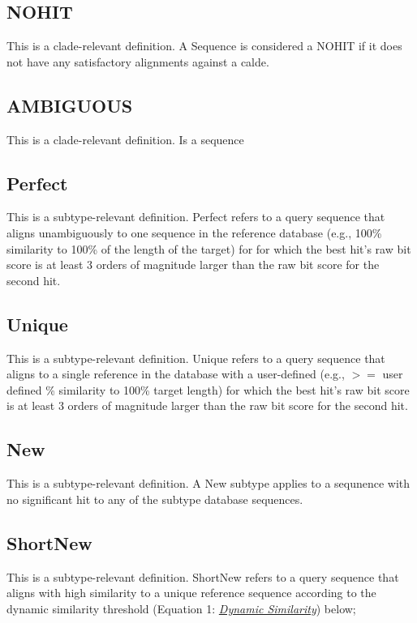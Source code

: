 \documentclass[letterpaper,10pt,english]{sphinxmanual}
\begin{document}
\subsection{NOHIT}
\label{defs:nohits}\label{defs:nohit}
This is a clade-relevant definition. A Sequence is considered a NOHIT if it does not have any satisfactory alignments against a calde.


\subsection{AMBIGUOUS}
\label{defs:ambiguous}\label{defs:id1}
This is a clade-relevant definition. Is a sequence


\subsection{Perfect}
\label{defs:perfect}\label{defs:id2}
This is a subtype-relevant definition. Perfect refers to a query
sequence that aligns unambiguously to one sequence in the reference
database (e.g., 100\% similarity to 100\% of the length of the target)
for for which the best hit's raw bit score is at least 3 orders of
magnitude larger than the raw bit score for the second hit.


\subsection{Unique}
\label{defs:unique}\label{defs:id3}
This is a subtype-relevant definition. Unique refers to a query sequence that aligns to a single reference in
the database with a user-defined (e.g., \(>=\) user defined \% similarity
to 100\% target length) for which the best hit's raw bit score is at
least 3 orders of magnitude larger than the raw bit score for the
second hit.


\subsection{New}
\label{defs:new}\label{defs:id4}
This is a subtype-relevant definition. A New subtype applies to a sequnence with no significant hit to any of the subtype database sequences.


\subsection{ShortNew}
\label{defs:id5}\label{defs:shortnew}
This is a subtype-relevant definition. ShortNew refers to a query sequence that aligns with high similarity to
a unique reference sequence according to the dynamic similarity
threshold (Equation 1: {\hyperref[defs:dynamic-similarity]{\emph{Dynamic Similarity}}}) below;
\end{document}
